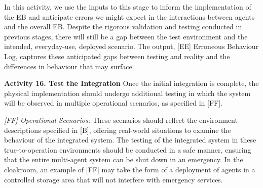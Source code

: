 \documentclass[runningheads]{llncs}
\begin{document}
In this activity, we use the inputs to this stage to inform the implementation of the EB and anticipate errors we might expect in the interactions between agents and the overall EB. Despite the rigorous validation and testing conducted in previous stages, there will still be a gap between the test environment and the intended, everyday-use, deployed scenario. The output, [EE] Erroneous Behaviour Log, captures these anticipated gaps between testing and reality and the differences in behaviour that may surface. 

\noindent\textbf{Activity 16. Test the Integration} Once the initial integration is complete, the physical implementation should undergo additional testing in which the system will be observed in multiple operational scenarios, as specified in [FF].

\emph{[FF] Operational Scenarios:} These scenarios should reflect the environment descriptions specified in [B], offering real-world situations to examine the behaviour of the integrated system. The testing of the integrated system in these true-to-operation environments should be conducted in a safe manner, ensuring that the entire multi-agent system can be shut down in an emergency. 
In the cloakroom, an example of [FF] may take the form of a deployment of agents in a controlled storage area that will not interfere with emergency services.
%
%
\end{document}
